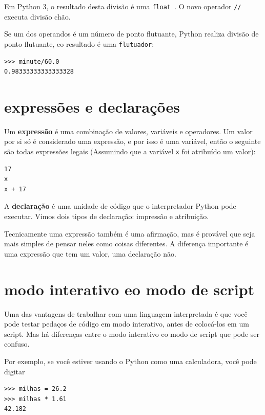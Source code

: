 \documentclass[10pt]{book}
\begin{document}
Em Python 3, o resultado desta divisão é uma {\tt float }. O novo operador
{\tt //} executa divisão chão.

Se um dos operandos é um número de ponto flutuante, Python realiza
divisão de ponto flutuante, eo resultado é uma {\tt flutuador}:

\begin{verbatim}
>>> minute/60.0
0.98333333333333328
\end{verbatim}


\section{expressões e declarações}

Um {\bf expressão} é uma combinação de valores, variáveis ​​e operadores.
Um valor por si só é considerado uma expressão, e por isso é
uma variável, então o seguinte são todas expressões legais
(Assumindo que a variável {\tt x} foi atribuído um valor):

\begin{verbatim}
17
x
x + 17
\end{verbatim}
%
A {\bf declaração} é uma unidade de código que o interpretador Python pode
executar. Vimos dois tipos de declaração: impressão e
atribuição.

Tecnicamente uma expressão também é uma afirmação, mas é provável que seja
mais simples de pensar neles como coisas diferentes. A diferença importante
é uma expressão que tem um valor, uma declaração não.


\section{modo interativo eo modo de script}

Uma das vantagens de trabalhar com uma linguagem interpretada é que
você pode testar pedaços de código em modo interativo, antes de colocá-los
em um script. Mas há diferenças entre o modo interativo
eo modo de script que pode ser confuso.

Por exemplo, se você estiver usando o Python como uma calculadora, você pode digitar

\begin{verbatim}
>>> milhas = 26.2
>>> milhas * 1.61
42.182
\end{verbatim}
\end{document}
